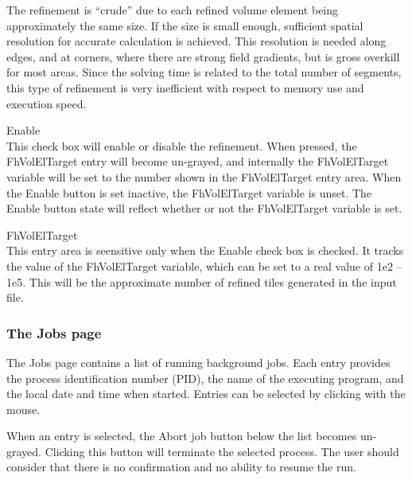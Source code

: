 The refinement is ``crude'' due to each refined volume element being
approximately the same size.  If the size is small enough, sufficient
spatial resolution for accurate calculation is achieved.  This
resolution is needed along edges, and at corners, where there are
strong field gradients, but is gross overkill for most areas.  Since
the solving time is related to the total number of segments, this type
of refinement is very inefficient with respect to memory use and
execution speed.

\begin{description}
\item{\cb Enable}\\
This check box will enable or disable the refinement.  When pressed,
the {\cb FhVolElTarget} entry will become un-grayed, and internally
the {\et FhVolElTarget} variable will be set to the number shown
in the {\cb FhVolElTarget} entry area.  When the {\cb Enable} button
is set inactive, the {\et FhVolElTarget} variable is unset.  The {\cb
Enable} button state will reflect whether or not the {\et
FhVolElTarget} variable is set.

\item{\cb FhVolElTarget}\\
This entry area is seensitive only when the {\cb Enable} check box is
checked.  It tracks the value of the {\et FhVolElTarget} variable,
which can be set to a real value of 1e2 -- 1e5.  This will be the
approximate number of refined tiles generated in the input file.
\end{description}

\subsubsection{The Jobs page}

The {\cb Jobs} page contains a list of running background jobs.  Each
entry provides the process identification number (PID), the name of
the executing program, and the local date and time when started. 
Entries can be selected by clicking with the mouse.

When an entry is selected, the {\cb Abort job} button below the list
becomes un-grayed.  Clicking this button will terminate the selected
process.  The user should consider that there is no confirmation and
no ability to resume the run.

